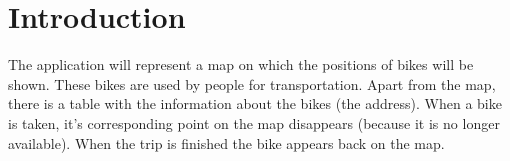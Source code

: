 \section{Introduction}

The application will represent a map on which the positions of bikes will be shown. These bikes are used by people
for transportation. Apart from the map, there is a table with the information about the bikes (the address). When a bike is taken, it’s corresponding point on the map disappears (because it is no longer available). When the trip is finished the bike appears back on the map. 